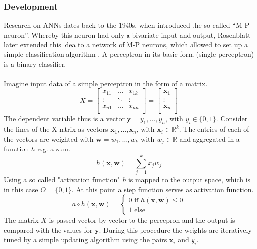 \documentclass[11pt,a4paper]{article}
\begin{document}
\subsubsection{Development} \label{ANN_development}
Research on ANNs dates back to the 1940s, when \cite{McCulloch1943} introduced the so called “M-P neuron”. Whereby this neuron had only a bivariate input and output, Rosenblatt later extended this idea to a network of M-P neurons, which allowed to set up a simple classification algorithm \cite{Rb1958}. A perceptron in its basic form (single perceptron) is a binary classifier. \\
\\
Imagine input data of a simple perceptron in the form of a matrix. 
$$X= \left[
\begin{array}{rrr}                                
x_{11} & \dots & x_{1k} \\                                               
\vdots & \ddots & \vdots \\                                               
x_{n1} & \dots & x_{nn} \\                                             
\end{array}
\right] = \left[
\begin{array}{r}                                
\textbf{x}_{1} \\                                               
\vdots \\                                               
\textbf{x}_{n} \\                                             
\end{array}
\right]
$$ 
The dependent variable thus is a vector $\textbf{y}=y_1,…,y_n$, with $y_i\in \{0,1\}$. Consider the lines of the X mtrix as vectors $\textbf{x}_1,…,\textbf{x}_n$, with $\textbf{x}_i\in\mathbb{R}^k$. The entries of each of the vectors are weighted with $\textbf{w}=w_1,\dots,w_k$ with $w_j \in \mathbb{R}$ and aggregated in a function $h$ e.g. a sum.
$$h(\textbf{x},\textbf{w})=\sum_{j=1}^kx_jw_j$$
Using a so called "activation function" $h$ is mapped to the output space, which is in this case $O=\{0,1\}$. At this point a step function serves as activation function.
$$a \circ h(\textbf{x},\textbf{w}) = \begin{cases} 0 \text{ if } h(\textbf{x},\textbf{w}) \leq 0 \\ 1 \text{ else}\end{cases}$$
The matrix $X$ is passed vector by vector to the percepron and the output is compared with the values for $\textbf{y}$. During this procedure the weights are iteratively tuned by a simple updating algorithm using the pairs $\textbf{x}_i$ and $y_i.$
\end{document}
